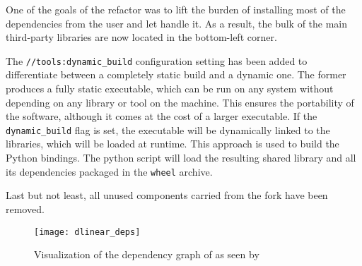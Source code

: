 One of the goals of the refactor was to lift the burden of installing most of the dependencies from the user and let \bazel handle it.
As a result, the bulk of the main third-party libraries are now located in the bottom-left corner.

The \texttt{//tools:dynamic_build} configuration setting has been added to differentiate between a completely static build and a dynamic one.
The former produces a fully static executable, which can be run on any system without depending on any library or tool on the machine.
This ensures the portability of the software, although it comes at the cost of a larger executable.
If the \texttt{dynamic\_build} flag is set, the executable will be dynamically linked to the libraries, which will be loaded at runtime.
This approach is used to build the Python bindings.
The python script will load the resulting shared library and all its dependencies packaged in the \texttt{wheel} archive.

Last but not least, all unused components carried from the \dreal fork have been removed.

\begin{figure}[h]
    \centering
    \texttt{[image: dlinear\_deps]}
    \caption{Visualization of the dependency graph of \dlinear as seen by \bazel}\label{fig:dlinear-deps}
\end{figure}
